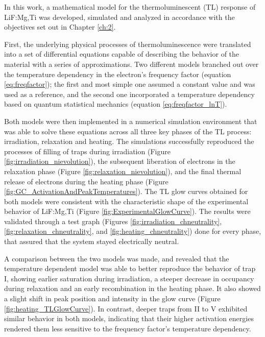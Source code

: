 In this work, a mathematical model for the thermoluminescent (TL) response of LiF:Mg,Ti was developed, simulated and analyzed in accordance with the objectives set out in Chapter \ref{ch:2}. 

\vspace{10pt}

First, the underlying physical processes of thermoluminescence were translated into a set of differential equations capable of describing the behavior of the material with a series of approximations. Two different models branched out over the temperature dependency in the electron's frequency factor (equation \ref{eq:freqfactor}); the first and most simple one assumed a constant value and was used as a reference, and the second one incorporated a temperature dependency based on quantum statistical mechanics (equation \ref{eq:freqfactor_lnT}). 

\vspace{10pt}

Both models were then implemented in a numerical simulation environment that was able to solve these equations across all three key phases of the TL process: irradiation, relaxation and heating. The simulations successfully reproduced the processes of filling of traps during irradiation (Figure \ref{fig:irradiation_nievolution}), the subsequent liberation of electrons in the relaxation phase (Figure \ref{fig:relaxation_nievolution}), and the final thermal release of electrons during the heating phase (Figure \ref{fig:GC_ActivationAndPeakTemperatures}). The TL glow curves obtained for both models were consistent with the characteristic shape of the experimental behavior of LiF:Mg,Ti (Figure \ref{fig:ExperimentalGlowCurve}). The results were validated through a test graph (Figures \ref{fig:irradiation_chneutrality}, \ref{fig:relaxation_chneutrality}, and \ref{fig:heating_chneutrality}) done for every phase, that assured that the system stayed electrically neutral.

\vspace{10pt}

A comparison between the two models was made, and revealed that the temperature dependent model was able to better reproduce the behavior of trap I, showing earlier saturation during irradiation, a steeper decrease in occupancy during relaxation and an early recombination in the heating phase. It also showed a slight shift in peak position and intensity in the glow curve (Figure \ref{fig:heating_TLGlowCurve}). In contrast, deeper traps from II to V exhibited similar behavior in both models, indicating that their higher activation energies rendered them less sensitive to the frequency factor's temperature dependency.

